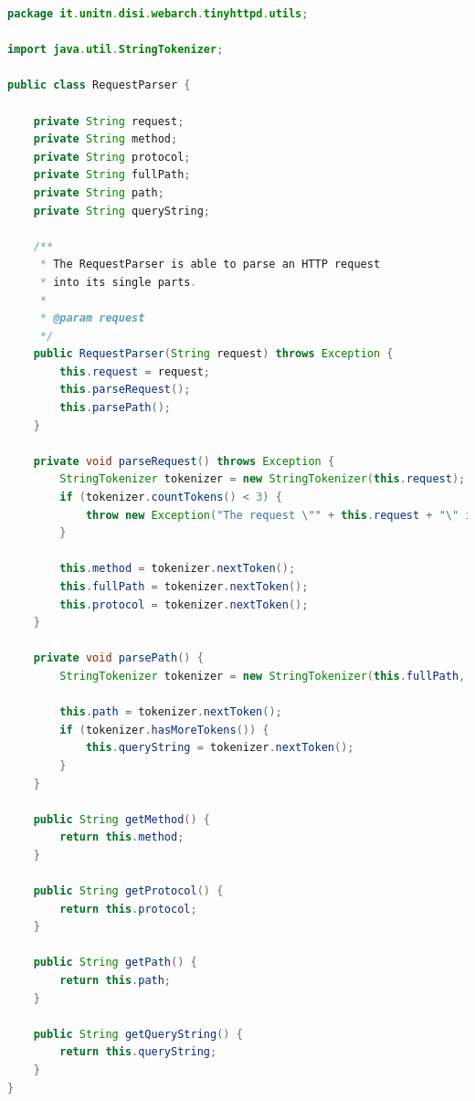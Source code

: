 \documentclass{article}
\begin{document}
\begin{lstlisting}[label=lst:01_part1_impl_tinyhttpd_requestparser, caption=CLI command to start a GitLab runner in a Docker container, language=java, numbers=none]
package it.unitn.disi.webarch.tinyhttpd.utils;

import java.util.StringTokenizer;

public class RequestParser {

    private String request;
    private String method;
    private String protocol;
    private String fullPath;
    private String path;
    private String queryString;

    /**
     * The RequestParser is able to parse an HTTP request
     * into its single parts.
     *
     * @param request
     */
    public RequestParser(String request) throws Exception {
        this.request = request;
        this.parseRequest();
        this.parsePath();
    }

    private void parseRequest() throws Exception {
        StringTokenizer tokenizer = new StringTokenizer(this.request);
        if (tokenizer.countTokens() < 3) {
            throw new Exception("The request \"" + this.request + "\" is invalid");
        }

        this.method = tokenizer.nextToken();
        this.fullPath = tokenizer.nextToken();
        this.protocol = tokenizer.nextToken();
    }

    private void parsePath() {
        StringTokenizer tokenizer = new StringTokenizer(this.fullPath, "?");

        this.path = tokenizer.nextToken();
        if (tokenizer.hasMoreTokens()) {
            this.queryString = tokenizer.nextToken();
        }
    }

    public String getMethod() {
        return this.method;
    }

    public String getProtocol() {
        return this.protocol;
    }

    public String getPath() {
        return this.path;
    }

    public String getQueryString() {
        return this.queryString;
    }
}
\end{lstlisting}
\end{document}
